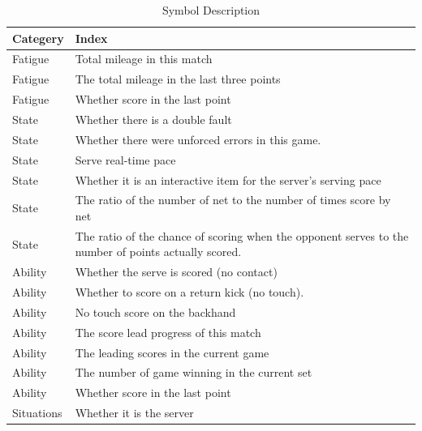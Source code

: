 \documentclass{article}
\begin{document}
\begin{table}[H]
      \centering
      \begin{tabular}{|>{\centering\arraybackslash}m{2.5cm}|p{}|}
      \hline
      \textbf{Categery} & \textbf{Index} \\ \hline
      Fatigue &  Total mileage in this match\\ \hline
      Fatigue &  The total mileage in the last three points \\ \hline
      Fatigue &  Whether score in the last point \\ \hline
      State & Whether there is a double fault \\ \hline
      State & Whether there were unforced errors in this game.\\ \hline
      State & Serve real-time pace  \\ \hline
      State & Whether it is an interactive item for the server's serving pace\\ \hline
      State &  The ratio of the number of net to the number of times score by net\\ \hline
      State & The ratio of the chance of scoring when the opponent serves to the number of points actually scored.\\ \hline
      Ability& Whether the serve is scored (no contact) \\ \hline
      Ability& Whether to score on a return kick (no touch). \\ \hline
      Ability& No touch score on the backhand \\ \hline
      Ability& The score lead progress of this match\\ \hline
      Ability& The leading scores in the current game \\ \hline
      Ability& The number of game winning in the current set \\ \hline
      Ability& Whether score in the last point \\ \hline
      Situations& Whether it is the server \\ \hline
      \end{tabular}
      \caption{Symbol Description}
\end{table}
\end{document}
